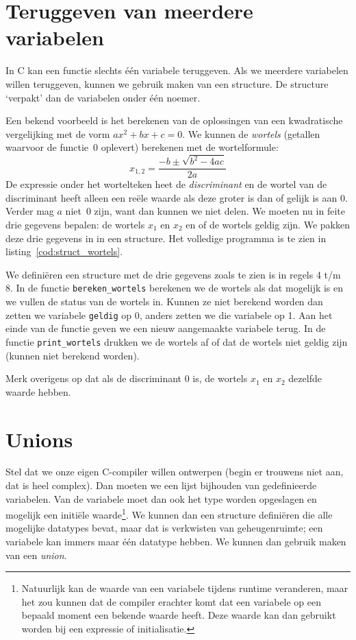 \section{Teruggeven van meerdere variabelen}
In C kan een functie slechts één variabele teruggeven. Als we meerdere variabelen willen teruggeven, kunnen we gebruik maken van een structure. De structure `verpakt' dan de variabelen onder één noemer.

Een bekend voorbeeld is het berekenen van de oplossingen van een kwadratische vergelijking met de vorm $ax^2+bx+c=0$. We kunnen de \textsl{wortels} (getallen waarvoor de functie~0 oplevert) berekenen met de wortelformule:
%
\begin{equation}
x_{1,2} = \dfrac{-b\pm\sqrt{b^2-4ac}}{2a}
\end{equation}
%
De expressie onder het wortelteken heet de \textsl{discriminant} en de wortel van de discriminant heeft alleen een reële waarde als deze groter is dan of gelijk is aan 0. Verder mag $a$ niet~0 zijn, want dan kunnen we niet delen. We moeten nu in feite drie gegevens bepalen: de wortels $x_1$ en $x_2$ en of de wortels geldig zijn. We pakken deze drie gegevens in in een structure. Het volledige programma is te zien in listing~\ref{cod:struct_wortels}.

We definiëren een structure met de drie gegevens zoals te zien is in regels 4 t/m 8. In de functie \texttt{bereken\_wortels} berekenen we de wortels als dat mogelijk is en we vullen de status van de wortels in. Kunnen ze niet berekend worden dan zetten we variabele \texttt{geldig} op 0, anders zetten we die variabele op 1. Aan het einde van de functie geven we een nieuw aangemaakte variabele terug. In de functie \texttt{print\_wortels} drukken we de wortels af of dat de wortels niet geldig zijn (kunnen niet berekend worden).


Merk overigens op dat als de discriminant 0 is, de wortels $x_1$ en $x_2$ dezelfde waarde hebben.

\advanced
\section{Unions}
Stel dat we onze eigen C-compiler willen ontwerpen (begin er trouwens niet aan, dat is heel complex). Dan moeten we een lijst bijhouden van gedefinieerde variabelen. Van de variabele moet dan ook het type worden opgeslagen en mogelijk een initiële waarde\footnote{Natuurlijk kan de waarde van een variabele tijdens runtime veranderen, maar het zou kunnen dat de compiler erachter komt dat een variabele op een bepaald moment een bekende waarde heeft. Deze waarde kan dan gebruikt worden bij een expressie of initialisatie.}. We kunnen dan een structure definiëren die alle mogelijke datatypes bevat, maar dat is verkwisten van geheugenruimte; een variabele kan immers maar één datatype hebben. We kunnen dan gebruik maken van een \textsl{union}.


